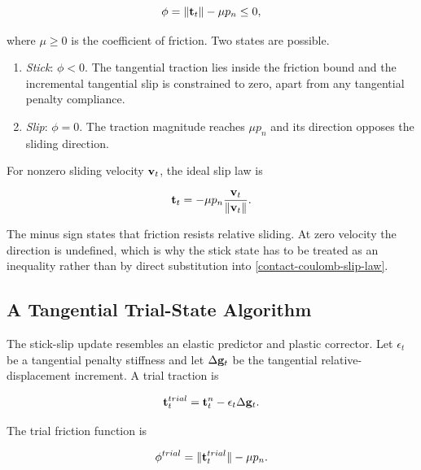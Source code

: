 \begin{bbox}
    \begin{equation}\label{contact-coulomb-yield-function}
        \phi = \| {\mathbf{t}_t} \| - \mu p_n \leq 0,
    \end{equation}
\end{bbox}

where $ \mu \geq 0 $ is the coefficient of friction. Two states are possible.

\begin{enumerate}
    \item \textit{Stick}: $ \phi < 0 $. The tangential traction lies inside the
        friction bound and the incremental tangential slip is constrained to
        zero, apart from any tangential penalty compliance.

    \item \textit{Slip}: $ \phi = 0 $. The traction magnitude reaches
        $ \mu p_n $ and its direction opposes the sliding direction.
\end{enumerate}

For nonzero sliding velocity $ \mathbf{v}_t $, the ideal slip law is

\begin{equation}\label{contact-coulomb-slip-law}
    \mathbf{t}_t = -\mu p_n
    \frac{\mathbf{v}_t}{\| {\mathbf{v}_t} \|}.
\end{equation}

The minus sign states that friction resists relative sliding. At zero velocity
the direction is undefined, which is why the stick state has to be treated as
an inequality rather than by direct substitution into
\eqref{contact-coulomb-slip-law}.

\subsection{A Tangential Trial-State Algorithm}

The stick-slip update resembles an elastic predictor and plastic corrector.
Let $ \epsilon_t $ be a tangential penalty stiffness and let
$ \Delta \mathbf{g}_t $ be the tangential relative-displacement increment. A trial
traction is

\begin{equation}\label{contact-friction-trial-traction}
    \mathbf{t}_t^{trial} = \mathbf{t}_t^n
    - \epsilon_t \Delta \mathbf{g}_t.
\end{equation}

The trial friction function is

\begin{equation}
    \phi^{trial} = \| {\mathbf{t}_t^{trial}} \| - \mu p_n.
\end{equation}

